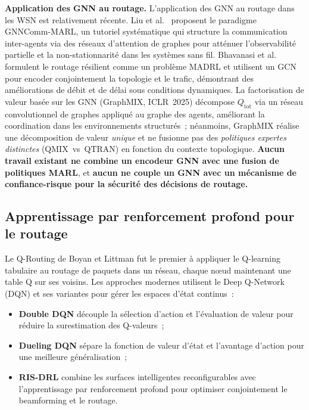 \textbf{Application des GNN au routage.} L'application des GNN au routage dans les WSN est relativement récente. Liu et al.\ \cite{liu2024gnncomm} proposent le paradigme GNNComm-MARL, un tutoriel systématique qui structure la communication inter-agents via des réseaux d'attention de graphes pour atténuer l'observabilité partielle et la non-stationnarité dans les systèmes sans fil. Bhavanasi et al.\ \cite{bhavanasi2023resilient} formulent le routage résilient comme un problème MADRL et utilisent un GCN pour encoder conjointement la topologie et le trafic, démontrant des améliorations de débit et de délai sous conditions dynamiques. La factorisation de valeur basée sur les GNN (GraphMIX, ICLR~2025) \cite{graphmix_iclr2025} décompose $Q_{\text{tot}}$ via un réseau convolutionnel de graphes appliqué au graphe des agents, améliorant la coordination dans les environnements structurés~; néanmoins, GraphMIX réalise une décomposition de valeur \emph{unique} et ne fusionne pas des \emph{politiques expertes distinctes} (QMIX~vs~QTRAN) en fonction du contexte topologique. \textbf{Aucun travail existant ne combine un encodeur GNN avec une fusion de politiques MARL}, et \textbf{aucun ne couple un GNN avec un mécanisme de confiance-risque pour la sécurité des décisions de routage.}

\subsection{Apprentissage par renforcement profond pour le routage}

Le Q-Routing de Boyan et Littman \cite{boyan1994packet} fut le premier à appliquer le Q-learning tabulaire au routage de paquets dans un réseau, chaque n\oe{}ud maintenant une table Q sur ses voisins. Les approches modernes utilisent le Deep Q-Network (DQN) \cite{mnih2015dqn} et ses variantes pour gérer les espaces d'état continus~:

\begin{itemize}
    \item \textbf{Double DQN} découple la sélection d'action et l'évaluation de valeur pour réduire la surestimation des Q-valeurs~;
    \item \textbf{Dueling DQN} sépare la fonction de valeur d'état et l'avantage d'action pour une meilleure généralisation~;
    \item \textbf{RIS-DRL} combine les surfaces intelligentes reconfigurables avec l'apprentissage par renforcement profond pour optimiser conjointement le beamforming et le routage.
\end{itemize}


